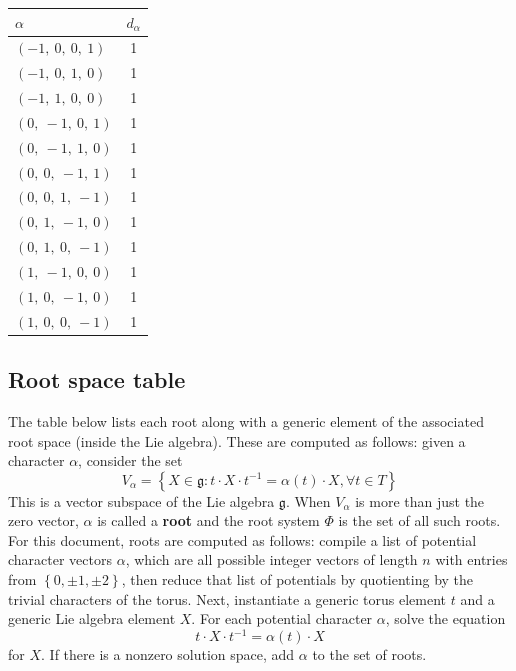 \documentclass[11pt]{article}
\newcommand{\noi}{\noindent}
\newcommand{\tbf}{\textbf}
\newcommand{\inv}{^{-1}}
\newcommand{\lb}{\left\{}
\newcommand{\rb}{\right\}}
\newcommand{\frakg}{\mathfrak{g}}
\theoremstyle{definition}
\begin{document}
\noindent \begin{tabular}{|l|c|}
    \hline
    \textbf{$\alpha$} & \textbf{$d_{\alpha}$} \\
    \hline
    $\left( -1, \  0, \  0, \  1\right)$ & 1 \\
    \hline
    $\left( -1, \  0, \  1, \  0\right)$ & 1 \\
    \hline
    $\left( -1, \  1, \  0, \  0\right)$ & 1 \\
    \hline
    $\left( 0, \  -1, \  0, \  1\right)$ & 1 \\
    \hline
    $\left( 0, \  -1, \  1, \  0\right)$ & 1 \\
    \hline
    $\left( 0, \  0, \  -1, \  1\right)$ & 1 \\
    \hline
    $\left( 0, \  0, \  1, \  -1\right)$ & 1 \\
    \hline
    $\left( 0, \  1, \  -1, \  0\right)$ & 1 \\
    \hline
    $\left( 0, \  1, \  0, \  -1\right)$ & 1 \\
    \hline
    $\left( 1, \  -1, \  0, \  0\right)$ & 1 \\
    \hline
    $\left( 1, \  0, \  -1, \  0\right)$ & 1 \\
    \hline
    $\left( 1, \  0, \  0, \  -1\right)$ & 1 \\
    \hline
\end{tabular}


\subsection{Root space table}

\noi The table below lists each root along with a generic element of the associated root space (inside the Lie algebra). These are computed as follows: given a character $\alpha$, consider the set
\[
	V_\alpha = \lb X \in \frakg : t \cdot X \cdot t \inv = \alpha(t) \cdot X, \forall t \in T \rb
\]
This is a vector subspace of the Lie algebra $\frakg$. When $V_\alpha$ is more than just the zero vector, $\alpha$ is called a \tbf{root} and the root system $\Phi$ is the set of all such roots. For this document, roots are computed as follows: compile a list of potential character vectors $\alpha$, which are all possible integer vectors of length $n$ with entries from $\lb 0, \pm 1, \pm 2 \rb$, then reduce that list of potentials by quotienting by the trivial characters of the torus. Next, instantiate a generic torus element $t$ and a generic Lie algebra element $X$. For each potential character $\alpha$, solve the equation
\[
	t \cdot X \cdot t \inv = \alpha(t) \cdot X
\]
for $X$. If there is a nonzero solution space, add $\alpha$ to the set of roots.
\end{document}
